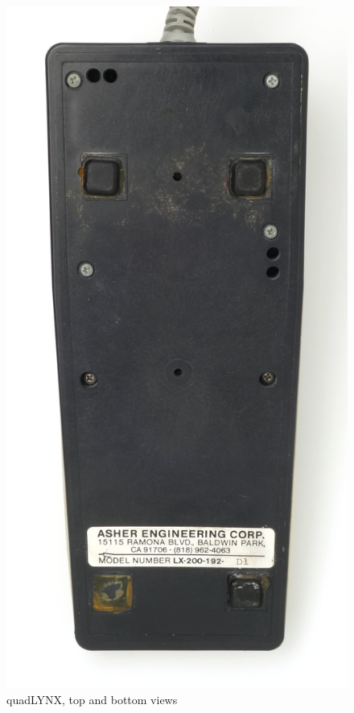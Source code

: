 \documentclass[11pt, a4paper]{article}
\begin{document}
\begin{figure}[h]
    \includegraphics[scale=0.4]{1986_honeywell_asher_quadlynx_trackball/bottom_30.jpg}
    \caption{quadLYNX, top and bottom views}
    \label{fig:quadLYNXTopBottom}
\end{figure}
\end{document}
